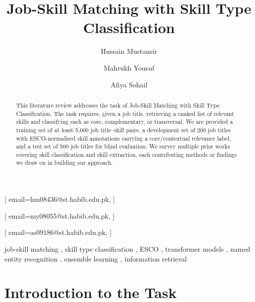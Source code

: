 \documentclass[]{ceurart}
\begin{document}


\title{Job-Skill Matching with Skill Type Classification}

\tnotemark[1]

\author[1]{Hussain Mustansir}[
email=hm08436@st.habib.edu.pk,
]
\cormark[1]
\fnmark[1]
\author[1]{Mahrukh Yousuf}[
email=my08055@st.habib.edu.pk,
]
\fnmark[1]
\author[1]{Afiya Sohail}[
email=as09186@st.habib.edu.pk,
]
\fnmark[1]
\address[1]{Habib University, Karachi, Pakistan}


\begin{abstract}
This literature review addresses the task of Job-Skill Matching with Skill Type
Classification. The task requires, given a job title, retrieving a ranked list of relevant
skills and classifying each as core, complementary, or transversal. We are provided a
training set of at least 5,000 job title--skill pairs, a development set of 200 job titles
with ESCO-normalised skill annotations carrying a core/contextual relevance label, and a
test set of 500 job titles for blind evaluation. We survey multiple prior works covering 
skill classification and skill extraction, each contributing methods or findings we draw on
in building our approach.
\end{abstract}

\begin{keywords}
  job-skill matching \sep
  skill type classification \sep
  ESCO \sep
  transformer models \sep
  named entity recognition \sep
  ensemble learning \sep
  information retrieval
\end{keywords}

\maketitle

\section{Introduction to the Task}
\end{document}
